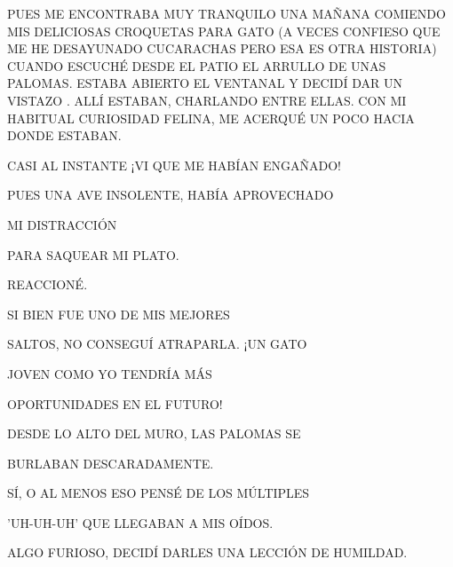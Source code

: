 \newpage
{}	
PUES ME ENCONTRABA MUY TRANQUILO UNA MAÑANA COMIENDO MIS DELICIOSAS CROQUETAS PARA GATO (A VECES CONFIESO QUE ME HE DESAYUNADO CUCARACHAS PERO ESA ES OTRA HISTORIA) 
\newline\newline\newline
\newline\newline\newline	\newline\newline 
CUANDO ESCUCHÉ DESDE EL PATIO EL ARRULLO DE UNAS PALOMAS.
ESTABA ABIERTO EL VENTANAL Y DECIDÍ DAR UN VISTAZO . ALLÍ ESTABAN, CHARLANDO ENTRE ELLAS. CON MI HABITUAL CURIOSIDAD FELINA, ME ACERQUÉ UN POCO HACIA DONDE ESTABAN.






\newpage
{}	
CASI AL INSTANTE \hspace{.3\textwidth}¡VI QUE ME HABÍAN ENGAÑADO! 

PUES UNA AVE \hspace{.3\textwidth}INSOLENTE, HABÍA APROVECHADO 

MI DISTRACCIÓN 

PARA SAQUEAR 				
MI PLATO.

REACCIONÉ.

SI BIEN FUE UNO			
DE MIS MEJORES		

SALTOS, NO CONSEGUÍ 			  
ATRAPARLA. ¡UN GATO 

JOVEN COMO YO TENDRÍA MÁS

OPORTUNIDADES EN EL FUTURO! 

DESDE LO ALTO DEL MURO, LAS 			  
PALOMAS SE

BURLABAN DESCARADAMENTE. 

SÍ, O AL MENOS ESO PENSÉ DE LOS MÚLTIPLES 

'UH-UH-UH' QUE LLEGABAN A MIS OÍDOS.

ALGO FURIOSO, DECIDÍ DARLES UNA LECCIÓN DE HUMILDAD.


